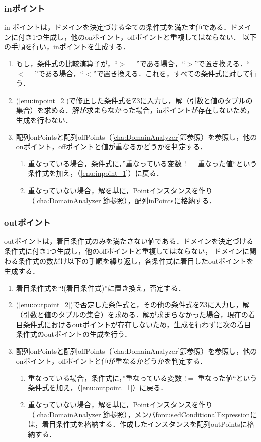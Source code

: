 \documentclass[uplatex, report, a4j, 10pt]{jsbook}
\begin{document}
\subsubsection{inポイント}
in ポイントは，ドメインを決定づける全ての条件式を満たす値である．ドメインに付き1つ生成し，他のonポイント，offポイントと重複してはならない．
以下の手順を行い，inポイントを生成する．
\begin{enumerate}
	\item\label{enu:inpoint_2} もし，条件式の比較演算子が，“$>=$”である場合，“$>$”で置き換える．“$<=$”である場合，“$<$”で置き換える．これを，すべての条件式に対して行う．
	\item\label{enu:inpoint_1} (\ref{enu:inpoint_2})で修正した条件式をZ3に入力し，解（引数と値のタプルの集合）を求める．解が求まらなかった場合，inポイントが存在しないため，生成を行わない．
	\item 配列onPointsと配列offPoints（\ref{cha:DomainAnalyzer}節参照）を参照し，他のonポイント，offポイントと値が重なるかどうかを判定する．
	      \begin{enumerate}
	      	\item 重なっている場合，条件式に，”重なっている変数 $!=$ 重なった値“という条件式を加え，（\ref{enu:inpoint_1}）に戻る．
	      	\item 重なっていない場合，解を基に，Pointインスタンスを作り（\ref{cha:DomainAnalyzer}節参照），配列inPointsに格納する．
	      \end{enumerate}
\end{enumerate}

\subsubsection{outポイント}
outポイントは，着目条件式のみを満たさない値である．ドメインを決定づける条件式に付き1つ生成し，他のoffポイントと重複してはならない，
ドメインに関わる条件式の数だけ以下の手順を繰り返し，各条件式に着目したoutポイントを生成する．
\begin{enumerate}
	\item\label{enu:outpoint_2} 着目条件式を“$!$(着目条件式)”に置き換え，否定する．
	\item\label{enu:outpoint_1} (\ref{enu:outpoint_2})で否定した条件式と，その他の条件式をZ3に入力し，解（引数と値のタプルの集合）を求める．解が求まらなかった場合，現在の着目条件式におけるoutポイントが存在しないため，生成を行わずに次の着目条件式のoutポイントの生成を行う．
	\item 配列onPointsと配列offPoints（\ref{cha:DomainAnalyzer}節参照）を参照し，他のonポイント，offポイントと値が重なるかどうかを判定する．
	      \begin{enumerate}
	      	\item 重なっている場合，条件式に，”重なっている変数 $!=$ 重なった値“という条件式を加え，（\ref{enu:outpoint_1}）に戻る．
	      	\item 重なっていない場合，解を基に，Pointインスタンスを作り（\ref{cha:DomainAnalyzer}節参照），メンバforcusedConditionalExpressionには，着目条件式を格納する．作成したインスタンスを配列outPointsに格納する．
	      \end{enumerate}
\end{enumerate}
\end{document}
